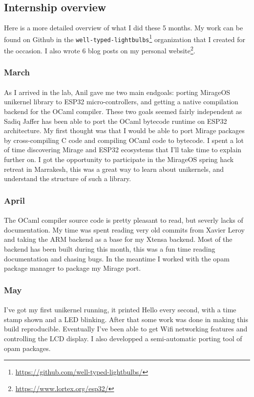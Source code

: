 \documentclass[a4paper]{article}
\begin{document}
\subsection{Internship overview}
Here is a more detailed overview of what I did these 5 months. My work can be found on Github in the \texttt{well-typed-lightbulbs}\footnote{\url{https://github.com/well-typed-lightbulbs/}} organization that I created for the occasion. I also wrote 6 blog posts on my personal website\footnote{\url{https://www.lortex.org/esp32/}}.
\subsubsection{March}
\paragraph{}
As I arrived in the lab, Anil gave me two main endgoals: porting MirageOS unikernel library to ESP32 micro-controllers, and getting a native compilation backend for the OCaml compiler. These two goals seemed fairly independent as Sadiq Jaffer has been able to port the OCaml bytecode runtime on ESP32 architecture. My first thought was that I would be able to port Mirage packages by cross-compiling C code and compiling OCaml code to bytecode. I spent a lot of time discovering Mirage and ESP32 ecosystems that I'll take time to explain further on. I got the opportunity to participate in the MirageOS spring hack retreat in Marrakesh, this was a great way to learn about unikernels, and understand the structure of such a library. 
\subsubsection{April}
\paragraph{}
The OCaml compiler source code is pretty pleasant to read, but severly lacks of documentation. My time was spent reading very old commits from Xavier Leroy and taking the ARM backend as a base for my Xtensa backend. Most of the backend has been built during this month, this was a fun time reading documentation and chasing bugs. 
In the meantime I worked with the opam package manager to package my Mirage port. 
\subsubsection{May}
\paragraph{}
I've got my first unikernel running, it printed Hello every second, with a time stamp shown and a LED blinking. After that some work was done in making this build reproducible. Eventually I've been able to get Wifi networking features and controlling the LCD display. I also developped a semi-automatic porting tool of opam packages.
\end{document}
